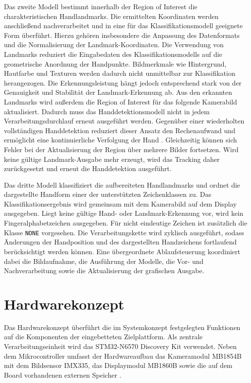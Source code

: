 Das zweite Modell bestimmt innerhalb der Region of Interest die charakteristischen Handlandmarks. Die ermittelten Koordinaten werden anschließend nachverarbeitet und in eine für das Klassifikationsmodell geeignete Form überführt. Hierzu gehören insbesondere die Anpassung des Datenformats und die Normalisierung der Landmark-Koordinaten. Die Verwendung von Landmarks reduziert die Eingabedaten des Klassifikationsmodells auf die geometrische Anordnung der Handpunkte. Bildmerkmale wie Hintergrund, Hautfarbe und Texturen werden dadurch nicht unmittelbar zur Klassifikation herangezogen. Die Erkennungsleistung hängt jedoch entsprechend stark von der Genauigkeit und Stabilität der Landmark-Erkennung ab. Aus den erkannten Landmarks wird außerdem die Region of Interest für das folgende Kamerabild aktualisiert. Dadurch muss das Handdetektionsmodell nicht in jedem Verarbeitungsdurchlauf erneut ausgeführt werden. Gegenüber einer wiederholten vollständigen Handdetektion reduziert dieser Ansatz den Rechenaufwand und ermöglicht eine kontinuierliche Verfolgung der Hand \cite[S. 4]{zhangMediaPipeHandsOndevice2020}. Gleichzeitig können sich Fehler bei der Aktualisierung der Region über mehrere Bilder fortsetzen. Wird keine gültige Landmark-Ausgabe mehr erzeugt, wird das Tracking daher zurückgesetzt und erneut die Handdetektion ausgeführt.

Das dritte Modell klassifiziert die aufbereiteten Handlandmarks und ordnet die dargestellte Handform einer der unterstützten Zeichenklassen zu. Das Klassifikationsergebnis wird gemeinsam mit dem Kamerabild auf dem Display ausgegeben. Liegt keine gültige Hand- oder Landmark-Erkennung vor, wird kein Fingeralphabetzeichen ausgegeben. Für nicht eindeutige Zeichen ist zusätzlich die Klasse \texttt{NONE} vorgesehen. Die Verarbeitungskette wird zyklisch ausgeführt, sodass Änderungen der Handposition und des dargestellten Handzeichens fortlaufend berücksichtigt werden können. Eine übergeordnete Ablaufsteuerung koordiniert dabei die Bildaufnahme, die Ausführung der Modelle, die Vor- und Nachverarbeitung sowie die Aktualisierung der grafischen Ausgabe.

\section{Hardwarekonzept}\label{sec:hardwarekonzept}

Das Hardwarekonzept überführt die im Systemkonzept festgelegten Funktionen auf die Komponenten der eingebetteten Zielplattform. Als zentrale Verarbeitungseinheit wird das STM32-N6570 Discovery Kit verwendet. Neben dem Mikrocontroller umfasst der Hardwareaufbau das Kameramodul MB1854B mit dem Bildsensor IMX335, das Displaymodul MB1860B sowie die auf dem Board vorhandenen externen Speicher \cite{STM32N6570DKProductSTMicroelectronics}.

